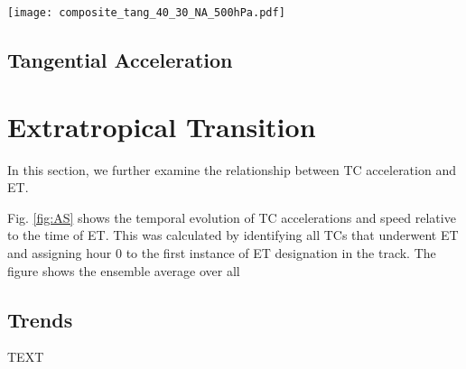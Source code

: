 \documentclass[wcd,manuscript]{copernicus}
\begin{document}
\begin{figure*}[t]
  \centering
    \texttt{[image: composite\_tang\_40\_30\_NA\_500hPa.pdf]}
  \caption{}
  \label{fig:lagCompZ}
\end{figure*}

\subsection{Tangential Acceleration}



\section{Extratropical Transition}

In this section, we further examine the relationship between TC acceleration and ET. 


Fig. \ref{fig:AS} shows the temporal evolution of TC accelerations and speed relative to the time of ET. This was calculated by identifying all TCs that underwent ET and assigning hour 0 to the first instance of ET designation in the track. The figure shows the ensemble average over all 

\subsection{Trends}


\conclusions  %
TEXT









\end{document}
